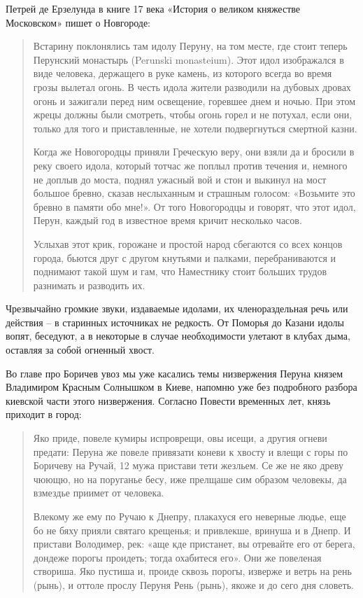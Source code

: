 Петрей де Ерзелунда в книге 17 века «История о великом княжестве Московском» пишет о Новгороде:

\begin{quotation}
Встарину поклонялись там идолу Перуну, на том месте, где стоит теперь Перунский монастырь (Perun\-ski monasteium). Этот идол изображался в виде человека, держащего в руке камень, из которого всегда во время грозы вылетал огонь. В честь идола жители разводили на дубовых дровах огонь и зажигали перед ним освещение, горевшее днем и ночью. При этом жрецы должны были смотреть, чтобы огонь горел и не потухал, если они, только для того и приставленные, не хотели подвергнуться смертной казни.

Когда же Новогородцы приняли Греческую веру, они взяли да и бросили в реку своего идола, который тотчас же поплыл против течения и, немного не доплыв до моста, поднял ужасный вой и стон и выкинул на мост большое бревно, сказав неслыханным и страшным голосом: «Возьмите это бревно в памяти обо мне!». От того Новогородцы и говорят, что этот идол, Перун, каждый год в известное время кричит несколько часов.

Услыхав этот крик, горожане и простой народ сбегаются со всех концов города, бьются друг с другом кнутьями и палками, перебраниваются и поднимают такой шум и гам, что Наместнику стоит больших трудов разнимать и разводить их.
\end{quotation}

Чрезвычайно громкие звуки, издаваемые идолами, их членораздельная речь или действия – в старинных источниках не редкость. От Поморья до Казани идолы вопят, беседуют, а в некоторые в случае необходимости улетают в клубах дыма, оставляя за собой огненный хвост.

Во главе про Боричев увоз мы уже касались темы низвержения Перуна князем Владимиром Красным Солнышком в Киеве, напомню уже без подробного разбора киевской части этого низвержения. Согласно Повести временных лет, князь приходит в город:

\begin{quotation}
Яко приде, повеле кумиры испроврещи, овы исещи, а другия огневи предати: Перуна же повеле привязати коневи к хвосту и влещи с горы по Боричеву на Ручай, 12 мужа пристави тети жезльем. Се же не яко древу чюющю, но на поруганье бесу, иже прелщаше сим образом человекы, да взмездье приимет от человека. 

Влекому же ему по Ручаю к Днепру, плакахуся его неверные людье, еще бо не бяху прияли святаго крещенья; и привлекше, вринуша и в Днепр. И пристави Володимер, рек: «аще кде пристанет, вы отревайте его от берега, дондеже порогы проидеть; тогда охабитеся его». Они же повеленая створиша. Яко пустиша и, проиде сквозь порогы, изверже и ветрь на рень (рынь), и оттоле прослу Перуня Рень (рынь), якоже и до сего дня словеть.
\end{quotation}

